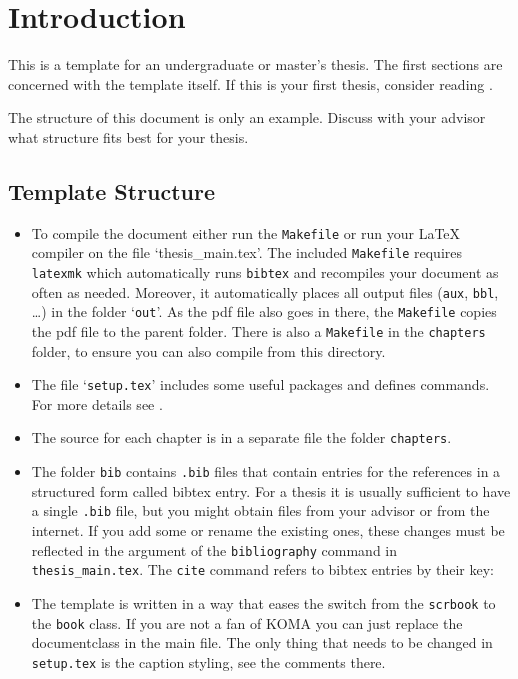\chapter{Introduction}\label{chap:introduction}
This is a template for an undergraduate or master's thesis.
The first sections are concerned with the template itself. If this is your first
thesis, consider reading .

The structure of this document is only an example.
Discuss with your advisor what structure fits best for your thesis.

\section{Template Structure}
\begin{itemize}
    \item To compile the document either run the \texttt{Makefile} or run your LaTeX compiler on the file `\textrm{thesis\_main.tex}'. The included \texttt{Makefile} requires \texttt{latexmk} which automatically runs \texttt{bibtex} and recompiles your document as often as needed. Moreover, it automatically places all output files (\texttt{aux}, \texttt{bbl}, \dots) in the folder `\texttt{out}'. As the pdf file also goes in there, the \texttt{Makefile} copies the pdf file to the parent folder. There is also a \texttt{Makefile} in the \texttt{chapters} folder, to ensure you can also compile from this directory.

    \item The file `\texttt{setup.tex}' includes some useful packages and defines commands. For more details see .

    \item The source for each chapter is in a separate file the folder \texttt{chapters}.

    \item The folder \texttt{bib} contains \texttt{.bib} files that
      contain entries for the references in a structured form called
      bibtex entry. For a thesis it is usually sufficient to have a
      single \texttt{.bib} file, but you might obtain files from your
      advisor or from the internet. If you add some or rename the
      existing ones, these changes must be reflected in the argument
      of the \texttt{bibliography} command in
      \texttt{thesis\_main.tex}. The \texttt{cite} command refers to
      bibtex entries by their key:
      

    \item The template is written in a way that eases the switch from
      the \texttt{scrbook} to the \texttt{book} class. If you are not
      a fan of KOMA you can just replace the documentclass in the main
      file. The only thing that needs to be changed in
      \texttt{setup.tex} is the caption styling, see the comments
      there.
\end{itemize}



